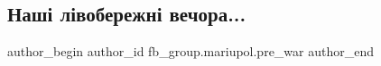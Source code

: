  
 
 
 
 

\subsection{Наші лівобережні  вечора...}
\label{sec:09_02_2023.fb.fb_group.mariupol.pre_war.7.nash__l_voberezhn___}

\ifcmt
 author_begin
   author_id fb_group.mariupol.pre_war
 author_end
\fi
